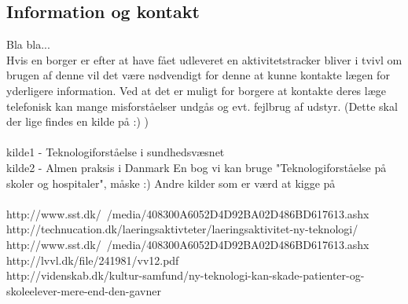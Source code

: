 \subsection{Information og kontakt}
Bla bla... \\
Hvis en borger er efter at have fået udleveret en aktivitetstracker bliver i tvivl om brugen af denne vil det være nødvendigt for denne at kunne kontakte lægen for yderligere information. Ved at det er muligt for borgere at kontakte deres læge telefonisk kan mange misforståelser undgås og evt. fejlbrug af udstyr. (Dette skal der lige findes en kilde på :) ) \\\\
kilde1 - Teknologiforståelse i sundhedsvæsnet \\
kilde2 - Almen praksis i Danmark
En bog vi kan bruge "Teknologiforståelse på skoler og hospitaler", måske :) 
Andre kilder som er værd at kigge på \\\\

http://www.sst.dk/~/media/408300A6052D4D92BA02D486BD617613.ashx \\
http://technucation.dk/laeringsaktivteter/laeringsaktivitet-ny-teknologi/ \\
http://www.sst.dk/~/media/408300A6052D4D92BA02D486BD617613.ashx \\
http://lvvl.dk/file/241981/vv12.pdf \\

http://videnskab.dk/kultur-samfund/ny-teknologi-kan-skade-patienter-og-skoleelever-mere-end-den-gavner